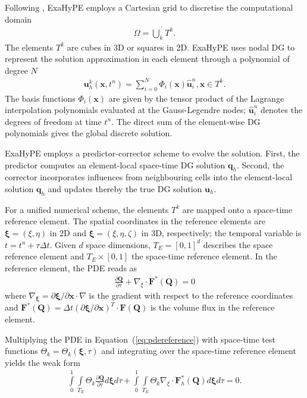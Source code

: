 \documentclass{acm_proc_article-sp}
\begin{document}
Following \cite{dumbser2014posteriori,dumbser2015high}, ExaHyPE employs a Cartesian grid to discretise the computational domain
\begin{align*}
\Omega = \dot{\bigcup \limits_k} T^k.
\end{align*}
The elements $T^k$ are cubes in 3D or squares in 2D. ExaHyPE uses nodal DG to represent the solution approximation in each element through a polynomial of degree $N$
\begin{align*}\mathbf{u}_h^k(\mathbf{x}, t^n) = \sum \limits_{i=0}^{N} \Phi_i(\mathbf{x}) \hat{\mathbf{u}}_i^n, \mathbf{x} \in T^k.\end{align*}
The basis functions $\Phi_i(\mathbf{x})$ are given by the tensor product of the Lagrange interpolation polynomials evaluated at the Gauss-Legendre nodes; $\hat{\mathbf{u}}_i^n$ denotes the degrees of freedom at time $t^n$. The direct sum of the element-wise DG polynomials gives the global discrete solution. 

ExaHyPE employs a predictor-corrector scheme to evolve the solution. First, the predictor computes an element-local space-time DG solution $\mathbf{q}_h$. Second, the corrector incorporates influences from neighbouring cells into the element-local solution $\mathbf{q}_h$ and updates thereby the true DG solution $\mathbf{u}_h$.

For a unified numerical scheme, the elements $T^k$ are mapped onto a space-time reference element. The spatial coordinates in the reference elements are $\mathbf{\xi} = (\xi, \eta)$ in 2D and $\mathbf{\xi} = (\xi, \eta, \zeta)$ in 3D, respectively; the temporal variable is $t = t^n + \tau \Delta t$. Given $d$ space dimensions, $T_E = [0,1]^d$ describes the space reference element and $T_E\times[0,1]$ the space-time reference element. In the reference element, the PDE reads as
\begin{align}
\frac{\partial \mathbf{Q}}{\partial \tau} + \nabla_{\xi}\cdot \mathbf{F}^*(\mathbf{Q}) = 0 \label{eq:pdereference}
\end{align}
where $\nabla_{\mathbf{\xi}} = \partial \mathbf{\mathbf{\xi}}/\partial \mathbf{x} \cdot \nabla$ is the gradient with respect to the reference coordinates and $\mathbf{F}^*(\mathbf{Q}) = \Delta t(\partial \mathbf{\xi}/\partial \mathbf{x})^T \cdot \mathbf{F}(\mathbf{Q})$ is the volume flux in the reference element.

Multiplying the PDE in Equation~(\ref{eq:pdereference}) with space-time test functions \mbox{$\Theta_k = \Theta_k(\mathbf{\xi}, \tau)$} and integrating over the space-time reference element yields the weak form
\begin{align}
\int \limits_{0}^{1} \int \limits_{T_E} \Theta_k \frac{\partial \mathbf{Q}}{\partial \tau} d\mathbf{\xi} d \tau+ \int \limits_{0}^{1} \int \limits_{T_E} \Theta_k \nabla_\xi \cdot \mathbf{F}^*_h(\mathbf{Q}) d\mathbf{\xi} d\tau = 0.\label{eq:weakformreference}
\end{align}
\end{document}
